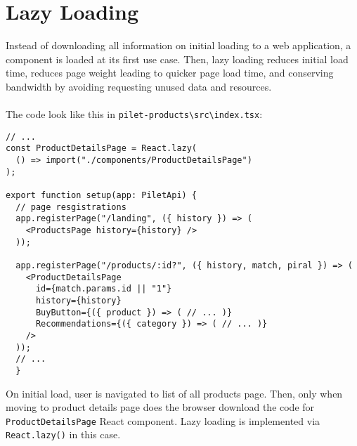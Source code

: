 \documentclass[a4paper]{book}
\begin{document}
\section{Lazy Loading}
Instead of downloading all information on initial loading to a web application, a component is loaded at its first use case. Then, lazy loading reduces initial load time, reduces page weight leading to quicker page load time, and conserving bandwidth by avoiding requesting unused data and resources.
\\ \\
The code look like this in \verb|pilet-products\src\index.tsx|:
\begin{lstlisting}[caption={Lazy loading of a React component in pilet-products index.tsx file}]
  // ...
const ProductDetailsPage = React.lazy(
  () => import("./components/ProductDetailsPage")
);

export function setup(app: PiletApi) {
  // page resgistrations
  app.registerPage("/landing", ({ history }) => ( 
    <ProductsPage history={history} />
  ));

  app.registerPage("/products/:id?", ({ history, match, piral }) => (
    <ProductDetailsPage
      id={match.params.id || "1"}
      history={history}
      BuyButton={({ product }) => ( // ... )}
      Recommendations={({ category }) => ( // ... )}
    />
  ));
  // ...
  }
\end{lstlisting}
On initial load, user is navigated to list of all products page. Then, only when moving to product details page does the browser download the code for \verb|ProductDetailsPage| React component. Lazy loading is implemented via \verb|React.lazy()|\cite{ReactLazy} in this case.
\end{document}
